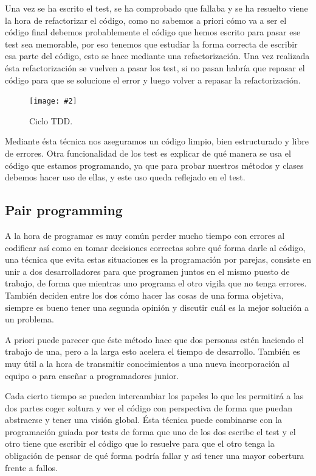 \documentclass[12pt,a4paper,spanish]{book} %
\newcommand{\imgCentradaMed}[3]{
\begin{figure}[H]
\begin{center}
\texttt{[image: \#2]}
\caption{#3}
\label{#1}
\end{center}
\end{figure}
}
\begin{document}
Una vez se ha escrito el test, se ha comprobado que fallaba y se ha resuelto viene la hora de refactorizar el código, como no sabemos  a priori cómo va a ser el código final debemos probablemente el código que hemos escrito para pasar ese test sea memorable, por eso tenemos que estudiar la forma correcta de escribir esa parte del código, esto se hace mediante una refactorización. Una vez realizada ésta refactorización se vuelven a pasar los test, si no pasan habría que repasar el código para que se solucione el error y luego volver a repasar la refactorización.

\imgCentradaMed{fig.2.3}{img/tdd.eps}{Ciclo TDD.}

\newpage

Mediante ésta técnica nos aseguramos un código limpio, bien estructurado y libre de errores. Otra funcionalidad de los test es explicar de qué manera se usa el código que estamos programando, ya que para probar nuestros métodos y clases debemos hacer uso de ellas, y este uso queda reflejado en el test.

\subsection{Pair programming}

\lettrine{A}{} la hora de programar es muy común perder mucho tiempo con errores al codificar así como en tomar decisiones correctas sobre qué forma darle al código, una técnica que evita estas situaciones es la programación por parejas, consiste en unir a dos desarrolladores para que programen juntos en el mismo puesto de trabajo, de forma que mientras uno programa el otro vigila que no tenga errores. También deciden entre los dos cómo hacer las cosas de una forma objetiva, siempre es bueno tener una segunda opinión y discutir cuál es la mejor solución a un problema.

A priori puede parecer que éste método hace que dos personas estén haciendo el trabajo de una, pero a la larga esto acelera el tiempo de desarrollo. También es muy útil a la hora de transmitir conocimientos a una nueva incorporación al equipo o para enseñar a programadores junior.

Cada cierto tiempo se pueden intercambiar los papeles lo que les permitirá a las dos partes coger soltura y ver el código con perspectiva de forma que puedan abstraerse y tener una visión global. Ésta técnica puede combinarse con la programación guiada por tests de forma que uno de los dos escribe el test y el otro tiene que escribir el código que lo resuelve para que el otro tenga la obligación de pensar de qué forma podría fallar y así tener una mayor cobertura frente a fallos.
\end{document}
